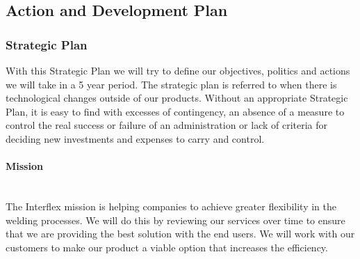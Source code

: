 \subsection{Action and Development Plan}
\subsubsection{Strategic Plan}

With this Strategic Plan we will try to define our objectives, politics and actions we will take in a 5 year period. 
The strategic plan is referred to when there is technological changes outside of our products. 
Without an appropriate Strategic Plan, it is easy to find with excesses of contingency, an absence of a measure to control the real success or failure of an administration or lack of criteria for deciding new investments and expenses to carry and control.

\paragraph*{Mission}~\\
The Interflex mission is helping companies to achieve greater flexibility in the welding processes.
We will do this by reviewing our services over time to ensure that we are providing the best solution with the end users.
We will work with our customers to make our product a viable option that increases the efficiency. 



